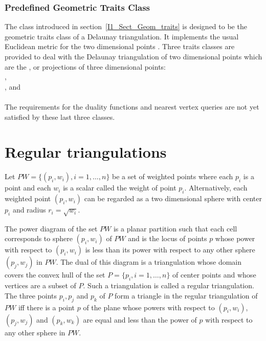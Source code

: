 \subsubsection{Predefined Geometric Traits Class}
The class 
introduced in section~\ref{I1_Sect_Geom_traits} is 
 designed to be 
the geometric traits class of a Delaunay triangulation.
It implements the usual Euclidean metric
for the  two dimensional points .
Three traits classes are provided to deal with
the Delaunay triangulation of two dimensional points which are
the ,  or  projections of three dimensional points:\\
,\\
, and\\
 \\
The requirements for the duality functions and nearest vertex
queries are not yet satisfied by
these last three classes.


\section{Regular triangulations}
\label{I1_Sect_Regular}
 
Let ${  PW} = \{(p_i, w_i), i = 1, \ldots , n \}$ be a set of 
weighted points where each $p_i$ is a point and each $w_i$
is a scalar called the weight of point $p_i$.
Alternatively, each weighted point $(p_i, w_i)$ can be regarded
as a two dimensional sphere with center $p_i$ and radius $r_i=\sqrt{w_i}$.

The power diagram of the set ${  PW}$ is a planar partition 
such that each cell corresponds to sphere $(p_i, w_i)$ of ${  PW}$
and is the locus of points  $p$ whose power with respect to $(p_i, w_i)$
is less than its power with respect to any other sphere $(p_j, w_j)$
in ${  PW}$. 
The dual of this diagram is a triangulation 
whose domain covers the convex hull of the set 
${  P}= \{ p_i, i = 1, \ldots , n \}$ of center points
and whose vertices are a subset of ${  P}$.
Such a triangulation is called a regular triangulation.
The  three points $p_i, p_j$ and $p_k$ of ${  P}$
form a triangle in the regular triangulation of ${  PW}$
iff there is a point $p$ of the plane whose
powers with respect to $(p_i, w_i)$, $(p_j, w_j)$
and $(p_k, w_k)$ are equal and less than the power of $p$
with respect to any other sphere in  ${  PW}$.


